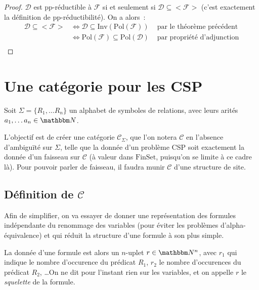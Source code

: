 \documentclass[12pt]{article}
\newcommand\Inv{\text{Inv}}
\newcommand\Pol{\text{Pol}}
\renewcommand\C{\mathscr{C}}
\newcommand\fset{\text{FinSet}}
\begin{document}
\begin{proof}
    $\mathcal{D}$ est pp-réductible à $\mathcal{F}$ si et seulement si
    $\mathcal{D}\subseteq<\mathcal{F}>$ (c'est exactement la définition de
    pp-réductibilité). On a alors~:
    \[\begin{array}{rll}
        \mathcal{D}\subseteq<\mathcal{F}>
          &\iff \mathcal{D}\subseteq\Inv(\Pol(\mathcal{F}))
            & \text{ par le théorème précédent} \\
          &\iff \Pol(\mathcal{F})\subseteq\Pol(\mathcal{D})
            & \text{ par propriété d'adjunction} \\
    \end{array}\]
\end{proof}


\section{Une catégorie pour les CSP}

Soit $\Sigma = \{R_1, \dots R_n\}$ un alphabet de symboles de relations, avec
leurs arités $a_1, \dots a_n\in\N$.

L'objectif est de créer une catégorie $\C_\Sigma$, que l'on notera $\C$ en l'absence
d'ambiguïté sur $\Sigma$, telle que la donnée d'un problème CSP soit exactement la donnée
d'un faisseau sur $\C$ (à valeur dans $\fset$, puisqu'on se limite à ce cadre là). Pour
pouvoir parler de faisseau, il faudra munir $\C$ d'une structure de site.

\subsection{Définition de $\C$}

Afin de simplifier, on va essayer de donner une représentation des formules indépendante
du renommage des variables (pour éviter les problèmes d'alpha-équivalence) et qui réduit
la structure d'une formule à son plus simple.

La donnée d'une formule est alors un $n$-uplet $r\in\N^n$, avec $r_1$ qui indique le
nombre d'occurence du prédicat $R_1$, $r_2$ le nombre d'occurences du prédicat $R_2$,
\dots On ne dit pour l'instant rien sur les variables, et on appelle $r$ le 
\emph{squelette} de la formule.
\end{document}
